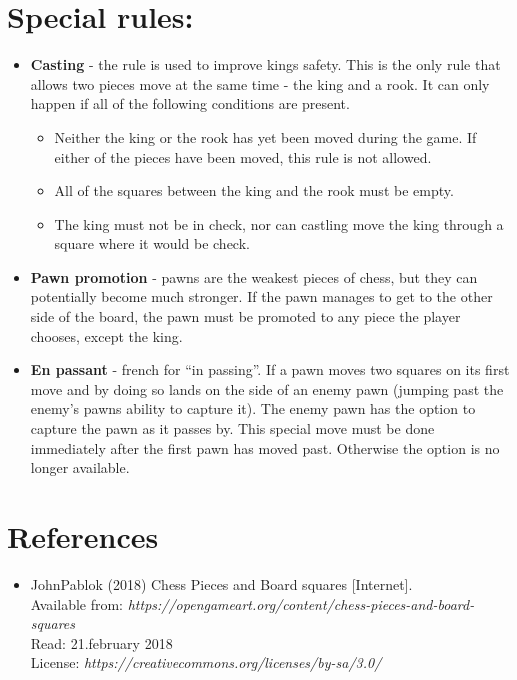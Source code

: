 \documentclass{article}
\begin{document}
\section{Special rules:}
\begin{itemize}

\item \textbf{Casting} - the rule is used to improve kings safety.  This is the only rule that allows two pieces move at the same time - the king and a rook. It can only happen if all of the following conditions are present.

\begin{itemize}
   \item Neither the king or the rook has yet been moved during the game. If either of the pieces have been moved, this rule is not allowed. 
   \item All of the squares between the king and the rook must be empty.
   \item The king must not be in check, nor can castling move the king through a square where it would be check. 
   \end{itemize}

\item \textbf{Pawn promotion} - pawns are the weakest pieces of chess, but they can potentially become much stronger. If the pawn manages to get to the other side of the board, the pawn must be promoted to any piece the player chooses, except the king. 

\item \textbf{En passant} - french for “in passing”. If a pawn moves two squares on its first move and by doing so lands on the side of an enemy pawn (jumping past the enemy’s pawns ability to capture it). The enemy pawn has the option to capture the pawn as it passes by. This special move must be done immediately after the first pawn has moved past. Otherwise the option is no longer available. 
\end{itemize}

\section{References}
\begin{itemize}
\item JohnPablok (2018) Chess Pieces and Board squares [Internet]. \\
	  Available from: \textit{https://opengameart.org/content/chess-pieces-and-board-squares} \\
	  Read: 21.february 2018\\
	  License: \textit{https://creativecommons.org/licenses/by-sa/3.0/}
\end{itemize}
\end{document}
